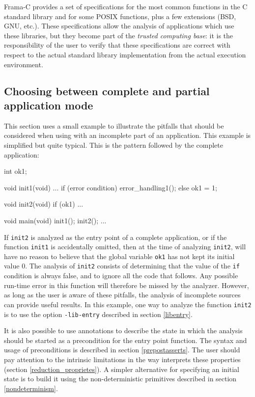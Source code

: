 \documentclass{frama-c-book}
\begin{document}
Frama-C provides a set of specifications for the most common functions in the C
standard library and for some POSIX functions, plus a few extensions
(BSD, GNU, etc.). These specifications allow the analysis of applications which
use these libraries, but they become part of the {\em trusted computing base}:
it is the responsibility of the user to verify that these specifications are
correct with respect to the actual standard library implementation from the
actual execution environment.

\subsection{Choosing between complete and partial application mode}

This section uses a small example to illustrate the pitfalls that should
be considered when using \Eva{} with an incomplete
part of an application.
This example is simplified but quite typical. This is the pattern followed
by the complete application:
\begin{listing}{1}
int ok1;

void init1(void) {
  ...
  if (error condition)
    error_handling1();
  else
    ok1 = 1;
}

void init2(void) {
  if (ok1) { ... }
}

void main(void) {
  init1();
  init2();
  ...
}
\end{listing}

If \lstinline|init2| is analyzed as the entry point of a complete application,
or if the function \lstinline|init1| is accidentally omitted, then
at the time of analyzing \lstinline|init2|, \Eva{} will have no reason
to believe that the global variable \lstinline|ok1| has not kept its initial value 0.
The analysis of \lstinline|init2| consists of determining
that the value of the \lstinline|if| condition is always false, and to ignore
all the code that follows. Any possible run-time error in this function
will therefore be missed by the analyzer.
However, as long as the user is aware of these pitfalls, the analysis of
incomplete sources can provide useful results. In this example, one way
to analyze the function \lstinline|init2| is to use the
option \lstinline|-lib-entry| described in section \ref{libentry}.

It is also possible to use annotations to describe the state in which
the analysis should be started as a precondition for the entry point
function. The syntax and usage of preconditions is described in
section \ref{prepostasserts}. The user should pay attention to the
intrinsic limitations in the way \Eva{} interprets these
properties (section \ref{reduction_proprietes}). A simpler alternative
for specifying an initial state is to build it
using the non-deterministic
primitives described in section \ref{nondeterminism}.
\end{document}
